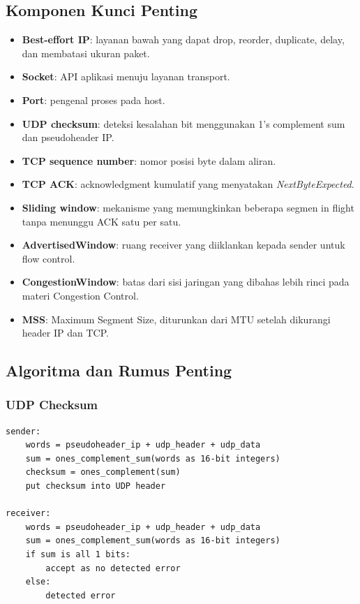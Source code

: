 \subsection{Komponen Kunci Penting}

\begin{itemize}
    \item \textbf{Best-effort IP}: layanan bawah yang dapat drop, reorder, duplicate, delay, dan membatasi ukuran paket.
    \item \textbf{Socket}: API aplikasi menuju layanan transport.
    \item \textbf{Port}: pengenal proses pada host.
    \item \textbf{UDP checksum}: deteksi kesalahan bit menggunakan 1's complement sum dan pseudoheader IP.
    \item \textbf{TCP sequence number}: nomor posisi byte dalam aliran.
    \item \textbf{TCP ACK}: acknowledgment kumulatif yang menyatakan \textit{NextByteExpected}.
    \item \textbf{Sliding window}: mekanisme yang memungkinkan beberapa segmen in flight tanpa menunggu ACK satu per satu.
    \item \textbf{AdvertisedWindow}: ruang receiver yang diiklankan kepada sender untuk flow control.
    \item \textbf{CongestionWindow}: batas dari sisi jaringan yang dibahas lebih rinci pada materi Congestion Control.
    \item \textbf{MSS}: Maximum Segment Size, diturunkan dari MTU setelah dikurangi header IP dan TCP.
\end{itemize}

\subsection{Algoritma dan Rumus Penting}

\subsubsection*{UDP Checksum}

\begin{lstlisting}[language={},caption={Skema UDP checksum berdasarkan sumber}]
sender:
    words = pseudoheader_ip + udp_header + udp_data
    sum = ones_complement_sum(words as 16-bit integers)
    checksum = ones_complement(sum)
    put checksum into UDP header

receiver:
    words = pseudoheader_ip + udp_header + udp_data
    sum = ones_complement_sum(words as 16-bit integers)
    if sum is all 1 bits:
        accept as no detected error
    else:
        detected error
\end{lstlisting}


